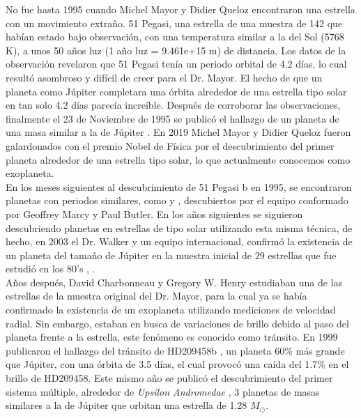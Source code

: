 No fue hasta 1995 cuando Michel Mayor y Didier Queloz encontraron una estrella con un movimiento extraño. 51 Pegasi, una estrella de una muestra de 142 que habían estado bajo observación, con una temperatura similar a la del Sol (5768 K), a unos 50 años luz (1 año luz = 9.461e+15 m) de distancia. Los datos de la observación revelaron que 51 Pegasi tenía un periodo orbital de 4.2 días, lo cual resultó asombroso y difícil de creer para el Dr. Mayor. El hecho de que un planeta como Júpiter completara una órbita alrededor de una estrella tipo solar en tan solo 4.2 días parecía increíble. Después de corroborar las observaciones, finalmente el 23 de Noviembre de 1995 se publicó el hallazgo de un planeta de una masa similar a la de Júpiter \citep{mayor1995jupiter}. En 2019 Michel Mayor y Didier Queloz fueron galardonados con el premio Nobel de Física por el descubrimiento del primer planeta alrededor de una estrella tipo solar, lo que actualmente conocemos como exoplaneta.\\

En los meses siguientes al descubrimiento de 51 Pegasi b en 1995, se encontraron planetas con periodos similares, como \cite{Marcy_1996} y \cite{butler1996planet}, descubiertos por el equipo conformado por Geoffrey Marcy y Paul Butler. En los años siguientes se siguieron descubriendo planetas en estrellas de tipo solar utilizando esta misma técnica, de hecho, en 2003 el Dr. Walker y un equipo internacional, confirmó la existencia de un planeta del tamaño de Júpiter en la muestra inicial de 29 estrellas que fue estudió en los 80's \cite{hatzes2003planetary}, \cite{walker2012first}.\\

Años después, David Charbonneau y Gregory W. Henry estudiaban una de las estrellas de la muestra original del Dr. Mayor, para la cual ya se había confirmado la existencia de un exoplaneta utilizando mediciones de velocidad radial. Sin embargo, estaban en busca de variaciones de brillo debido al paso del planeta frente a la estrella, este fenómeno es conocido como tránsito. En 1999 publicaron el hallazgo del tránsito de HD209458b \cite{charbonneau1999detection}, un planeta 60\% más grande que Júpiter, con una órbita de 3.5 días, el cual provocó una caída del 1.7\% en el brillo de HD209458. Este mismo año se publicó el descubrimiento del primer sistema múltiple, alrededor de \textit{Upsilon Andromedae} \cite{marcy1999three}, 3 planetas de masas similares a la de Júpiter que orbitan una estrella de 1.28 $M_{\odot}$.\\

